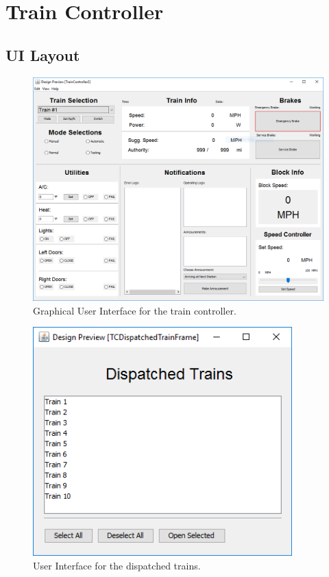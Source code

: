 \documentclass[letterpaper]{article}
\begin{document}
\section{Train Controller}

\subsection{UI Layout}

\begin{figure}[h!]
	\center
	\includegraphics[width=16cm]{traincontroller_gui.PNG}
	\caption{Graphical User Interface for the train controller.}
\end{figure}

\begin{figure}[h!]
	\center
	\includegraphics[width=10cm]{traincontroller_dispatchedtrains.PNG}
	\caption{User Interface for the dispatched trains.}
\end{figure}
\end{document}
